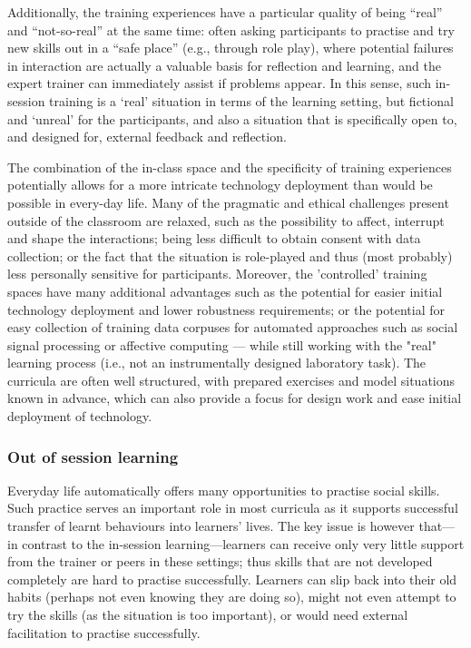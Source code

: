 \documentclass[prodmode,acmtochi]{acmsmall}
\newcommand{\GeraldineFIX}[1]{}
\begin{document}
Additionally,  the training experiences have a particular quality of being ``real'' and ``not-so-real'' at the same time: often asking participants to practise and try new skills out in a ``safe place'' (e.g., through role play), where potential failures in interaction are actually a valuable basis for reflection and learning, and the expert trainer can immediately assist if problems appear. In this sense, such in-session training is a `real' situation in terms of the learning setting, but fictional and `unreal' for the participants, and also a situation that is specifically open to, and designed for, external feedback and reflection. 

The combination of the in-class space and the specificity of training experiences potentially allows for a more intricate technology deployment than would be possible in every-day life. Many of the pragmatic and ethical challenges present outside of the classroom are relaxed, such as the possibility to affect, interrupt and shape the interactions; being less difficult to obtain consent with data collection; %
or the fact that the situation is role-played and thus (most probably) less personally sensitive for participants. Moreover, the 'controlled' training spaces have many additional advantages such as the potential for easier initial technology deployment and lower robustness requirements; or the potential for easy collection of training data corpuses for automated approaches such as social signal processing \GeraldineFIX{G: SSP - don't think this has been set up as an abbreviation before this? assume it is social sig  process?}or affective computing --- while still working with the "real" learning process (i.e., not an instrumentally designed laboratory task). The curricula are often well structured, with prepared exercises and model situations known in advance, which can also provide a focus for design work and ease initial deployment of technology. 


\subsubsection{Out of session learning}
Everyday life automatically offers many opportunities to practise social skills. Such practice serves an important role in most curricula as it supports successful transfer of learnt behaviours into learners' lives. 
%
The key issue is however that---in contrast to the in-session learning---learners can receive only very little support from the trainer or peers in these settings; thus skills that are not developed completely are hard to practise successfully. Learners can slip back into their old habits (perhaps not even knowing they are doing so), might not even attempt to try the skills (as the situation is too important), or would need external facilitation to practise successfully.  
\end{document}
